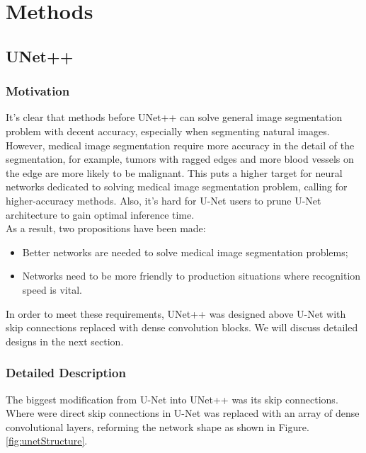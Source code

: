 \section{Methods}
\subsection{UNet++}
\subsubsection{Motivation}
It's clear that methods before UNet++\cite{unet_pp} can solve general image segmentation problem with decent accuracy, especially when segmenting natural images. However, medical image segmentation require more accuracy in the detail of the segmentation, for example, tumors with ragged edges and more blood vessels on the edge are more likely to be malignant. This puts a higher target for neural networks dedicated to solving medical image segmentation problem, calling for higher-accuracy methods. Also, it's hard for U-Net users to prune U-Net architecture to gain optimal inference time.\\
As a result, two propositions have been made:
\begin{itemize}
    \item Better networks are needed to solve medical image segmentation problems;
    \item Networks need to be more friendly to production situations where recognition speed is vital.
\end{itemize}
In order to meet these requirements, UNet++ was designed above U-Net\cite{unet} with skip connections replaced with dense convolution blocks. We will discuss detailed designs in the next section.

\subsubsection{Detailed Description}
The biggest modification from U-Net into UNet++ was its skip connections. Where were direct skip connections in U-Net was replaced with an array of dense convolutional layers, reforming the network shape as shown in Figure.\ref{fig:unetStructure}.

